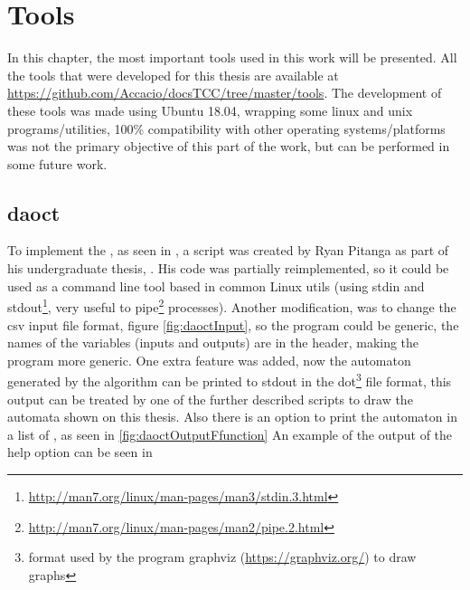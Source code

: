 
\chapter{Tools}
\label{cha:Tools}

In this chapter, the most important tools used in this work will be presented.
All the tools that were developed for this thesis are available at
\url{https://github.com/Accacio/docsTCC/tree/master/tools}. The development of
these tools was made using Ubuntu 18.04, wrapping some linux and unix
programs/utilities, 100\% compatibility with other operating systems/platforms
was not the primary objective of this part of the work, but can be performed in
some future work. 

\section{daoct}
\label{sec:daoct}

To implement the , as seen in
\cite{moreira2018enhanced}, a script was created by Ryan Pitanga as part of his
undergraduate thesis, \cite{pitanga2019modelo}. His code was partially
reimplemented, so it could be used as a command line tool based in common Linux
utils (using stdin and
stdout\footnote{\url{http://man7.org/linux/man-pages/man3/stdin.3.html}}, very
useful to pipe\footnote{\url{http://man7.org/linux/man-pages/man2/pipe.2.html}}
processes). Another modification, was to change the csv input file format,
figure \ref{fig:daoctInput}, so the
program could be generic, the names of the variables (inputs and outputs) are in
the header, making the program more generic. One extra feature was added,
now the automaton generated by the algorithm can be printed to stdout in the
dot\footnote{format used by the program graphviz (\url{https://graphviz.org/})
  to draw graphs} file format, this output can be treated by one of the further
described scripts to draw the automata shown on this thesis. Also there is an option to print
  the automaton in a list of \ffunction, as seen in \ref{fig:daoctOutputFfunction}
An example of the output of the help option can be seen in 
% 


